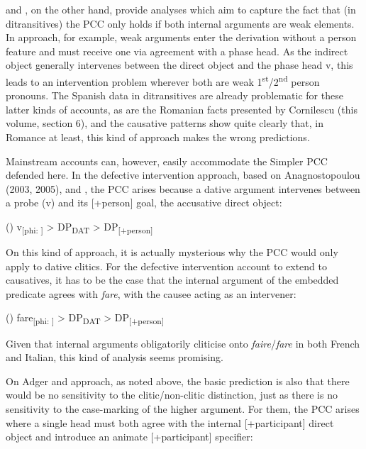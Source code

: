 \documentclass[output=paper,modfonts,nonflat]{langsci/langscibook}
\begin{document}
\citet{Bianchi2006} and \citet{Stegovec2017}, on the other hand, provide analyses which aim to capture the fact that (in ditransitives) the PCC only holds if both internal arguments are weak elements. In  approach, for example, weak arguments enter the derivation without a person feature and must receive one via agreement with a phase head. As the indirect object generally intervenes between the direct object and the phase head v, this leads to an intervention problem wherever both are weak 1\textsuperscript{st}/2\textsuperscript{nd} person pronouns. The Spanish data in ditransitives are already problematic for these latter kinds of accounts, as are the Romanian facts presented by Cornilescu (this volume, section 6), and the causative patterns show quite clearly that, in Romance at least, this kind of approach makes the wrong predictions. 

Mainstream accounts can, however, easily accommodate the Simpler PCC defended here. In the defective intervention approach, based on Anagnostopoulou (2003, 2005), \citet{BéjarRezac2003} and \citet{Rezac2008}, the PCC arises because a dative argument intervenes between a probe (v) and its [+person] goal, the accusative direct object:

()  v\textsubscript{[phi: ]}    > DP\textsubscript{DAT} >     DP\textsubscript{[+person]}

On this kind of approach, it is actually mysterious why the PCC would only apply to dative clitics. For the defective intervention account to extend to causatives, it has to be the case that the internal argument of the embedded predicate agrees with \textit{fare}, with the causee acting as an intervener:

()  fare\textsubscript{[phi: ]}   >  DP\textsubscript{DAT} >   DP\textsubscript{[+person]}

Given that internal arguments obligatorily cliticise onto \textit{faire}/\textit{fare} in both French and Italian, this kind of analysis seems promising. 

On Adger and  approach, as noted above, the basic prediction is also that there would be no sensitivity to the clitic/non-clitic distinction, just as there is no sensitivity to the case-marking of the higher argument. For them, the PCC arises where a single head must both agree with the internal [+participant] direct object and introduce an animate [+participant] specifier:
\end{document}
